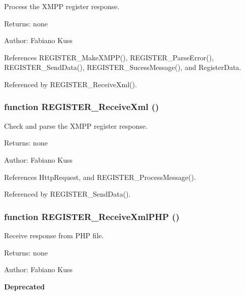 Process the XMPP register response. 

\begin{Desc}
\item[Returns:]none \end{Desc}
\begin{Desc}
\item[Author:]Fabiano Kuss \end{Desc}


References REGISTER\_\-MakeXMPP(), REGISTER\_\-ParseError(), REGISTER\_\-SendData(), REGISTER\_\-SucessMessage(), and RegisterData.

Referenced by REGISTER\_\-ReceiveXml().
\subsubsection[REGISTER\_\-ReceiveXml]{\setlength{\rightskip}{0pt plus 5cm}function REGISTER\_\-ReceiveXml ()}\label{register_8js_529d8fd46e940d2c418616e7288a9bef}


Check and parse the XMPP register response. 

\begin{Desc}
\item[Returns:]none \end{Desc}
\begin{Desc}
\item[Author:]Fabiano Kuss \end{Desc}


References HttpRequest, and REGISTER\_\-ProcessMessage().

Referenced by REGISTER\_\-SendData().
\subsubsection[REGISTER\_\-ReceiveXmlPHP]{\setlength{\rightskip}{0pt plus 5cm}function REGISTER\_\-ReceiveXmlPHP ()}\label{register_8js_05f0881d7603861b5b37ec98d0468d42}


Receive response from PHP file. 

\begin{Desc}
\item[Returns:]none \end{Desc}
\begin{Desc}
\item[Author:]Fabiano Kuss \end{Desc}
\begin{Desc}
\item[{\bf Deprecated}]\end{Desc}


